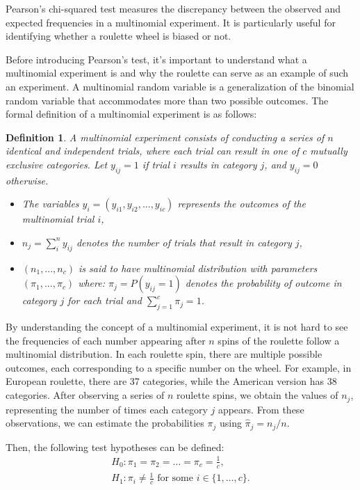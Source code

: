 \documentclass[11pt,twoside]{article}
\newtheorem{Definition}{Definition}
\numberwithin{Theorem}{section}
\numberwithin{Definition}{section}
\numberwithin{Lemma}{section}
\numberwithin{Algorithm}{section}
\numberwithin{equation}{section}
\begin{document}
Pearson's chi-squared test measures the discrepancy between the observed and expected frequencies in a multinomial experiment\cite{Agresti}. It is particularly useful for identifying whether a roulette wheel is biased or not.

Before introducing Pearson's test, it's important to understand what a multinomial experiment is and why the roulette can serve as an example of such an experiment. A multinomial random variable is a generalization of the binomial random variable that accommodates more than two possible outcomes. The formal definition of a multinomial experiment is as follows:

\begin{Definition}
A multinomial experiment consists of conducting a series of $n$ identical and independent trials, where each trial can result in one of $c$ mutually exclusive categories. Let $y_{ij} = 1$ if trial $i$ results in category $j$, and $y_{ij} = 0$ otherwise. 
\begin{itemize}
    \item The variables $y_{i} = (y_{i1},y_{i2},...,y_{ic})$ represents the outcomes of the multinomial trial $i$,
    \item $n_{j}= \sum_{i}^{n}y_{ij}$ denotes  the  number  of  trials  that result in category $j$,
    \item $(n_{1},...,n_{c})$ is said to have multinomial distribution with parameters $(\pi_{1},...,\pi_{c})$ where:
    $\pi_{j}=P(y_{ij}= 1)$ denotes  the  probability  of  outcome  in  category $j$ for each trial and $\sum_{j=1}^{c}\pi_{j} = 1$. 
\end{itemize}

\end{Definition}
By understanding the concept of a multinomial experiment, it is not hard to see the frequencies of each number appearing after $n$ spins of the roulette follow a multinomial distribution. In each roulette spin, there are multiple possible outcomes, each corresponding to a specific number on the wheel. For example, in European roulette, there are 37 categories, while the American version has 38 categories. After observing a series of $n$ roulette spins, we obtain the values of $n_{j}$, representing the number of times each category $j$ appears. From these observations, we can estimate the probabilities $\pi_{j}$ using $\hat{\pi}_{j}= n_{j}/n$.

Then, the following test hypotheses can be defined:
\begin{align*}
H_{0}: \pi_{1}= \pi_{2}= \ldots = \pi_{c} = \frac{1}{c},\\
H_{1}: \pi_{i} \neq \frac{1}{c} \text{ for some }i \in \{1, \ldots, c\}.
\end{align*}
\end{document}
